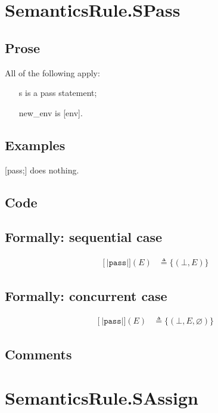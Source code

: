 \documentclass{book}
\newcommand\syntt[1]{\mathtt{#1}}
\newcommand\llbracket{[|}
\newcommand\rrbracket{|]}
\newcommand\interp[1]{\left\llbracket #1 \right\rrbracket}
\begin{document}
\section{SemanticsRule.SPass \label{sec:SemanticsRule.SPass}}

  \subsection{Prose}
  All of the following apply:
  \begin{itemize}
  \item [s] is a pass statement;
  \item [new\_env] is [env].
  \end{itemize}

  \subsection{Examples}
  [pass;] does nothing.

  \subsection{Code}

  \subsection{Formally: sequential case}
  \begin{align}
  \interp{\syntt{pass}} (E) & \triangleq \{ (\bot, E) \}
  \label{eq:sem-seq-spass}
  \end{align} 

  \subsection{Formally: concurrent case}
  \begin{align}
  \interp{\syntt{pass}} (E) & \triangleq \{ (\bot, E, \varnothing) \}
  \label{eq:sem-conc-spass}
  \end{align} 

  \subsection{Comments}

\section{SemanticsRule.SAssign \label{sec:SemanticsRule.SAssign}}
\end{document}
